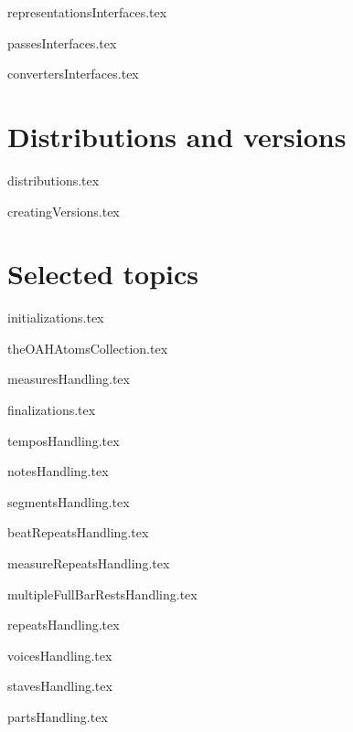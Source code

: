\documentclass[11pt,a4paper]{report}
\begin{document}
{representationsInterfaces.tex}

{passesInterfaces.tex}

{convertersInterfaces.tex}


\part{Distributions and versions}

{distributions.tex}

{creatingVersions.tex}


\part{Selected topics}


{initializations.tex}



{theOAHAtomsCollection.tex}



{measuresHandling.tex}

{finalizations.tex}

{temposHandling.tex}

{notesHandling.tex}

{segmentsHandling.tex}

{beatRepeatsHandling.tex}

{measureRepeatsHandling.tex}

{multipleFullBarRestsHandling.tex}

{repeatsHandling.tex}

{voicesHandling.tex}

{stavesHandling.tex}

{partsHandling.tex}
\end{document}

